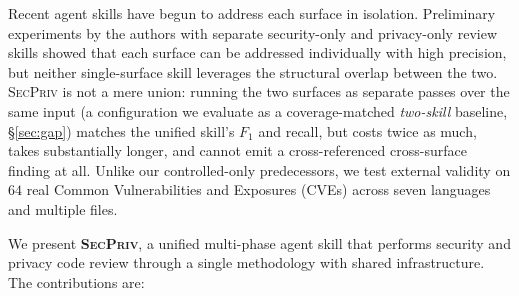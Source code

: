 \documentclass[runningheads]{llncs}
\begin{document}
Recent agent skills have begun to address each surface in isolation. Preliminary experiments by the authors with separate security-only and privacy-only review skills showed that each surface can be addressed individually with high precision, but neither single-surface skill leverages the structural overlap between the two. \textsc{SecPriv} is not a mere union: running the two surfaces as separate passes over the same input (a configuration we evaluate as a coverage-matched \emph{two-skill} baseline, \S\ref{sec:gap}) matches the unified skill's $F_1$ and recall, but costs twice as much, takes substantially longer, and cannot emit a cross-referenced cross-surface finding at all. Unlike our controlled-only predecessors, we test external validity on $64$ real Common Vulnerabilities and Exposures (CVEs) across seven languages and multiple files.

\noindent We present \textbf{\textsc{SecPriv}}, a unified multi-phase agent skill that performs security and privacy code review through a single methodology with shared infrastructure. The contributions are:
\end{document}
